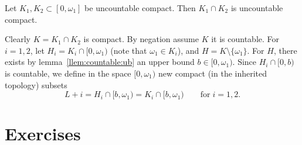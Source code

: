 \begin{llem}
Let \(K_1,K_2\subset [0,\omega_1]\) be uncountable compact.
Then \(K_1\cap K_2\) is uncountable compact.
\end{llem}
\begin{thmproof}
Clearly \(K = K_1\cap K_2\) is compact.
By negation assume $K$ it is countable.
For \(i=1,2\), let \(H_i = K_i\cap [0,\omega_1)\)
(note that \(\omega_1\in K_i\)),
and \(H=K\setminus \{\omega_1\}\).
For $H$, there exists by lemma~\ref{llem:countable:ub}
an upper bound \(b\in[0,\omega_1)\).
Since \(H_i\cap[0,b)\) is countable, we define
in the space \([0,\omega_1)\)
new compact (in the inherited topology) subsets
\begin{equation*}
 L+i = H_i \cap [b,\omega_1) = K_i \cap [b,\omega_1)
 \qquad \textrm{for}\; i=1,2.
\end{equation*}

\end{thmproof}


\iffalse
\begin{llem}
Let $X$ be a topological space, \(Y\subset X\) a subspace
with the topology inherited from $X$.
If \(K\subset X\) compact then \(K\cap Y\) is compact in $Y$
\end{llem}
\begin{thmproof}
Let \(\{V_i\}_{i\in I}\) be an open cover in $Y$ of \(K\cap Y\).
By the definition of the inherited topology, there are open sets
 \(\{V_i\}_{i\in I}\) in $X$ such that \(U_i = V_i \cap Y\) (for \(i\in I\).
For each \(i\in I\) we define \(W_i = V_i
\end{thmproof}
\fi


\section{Exercises} %

